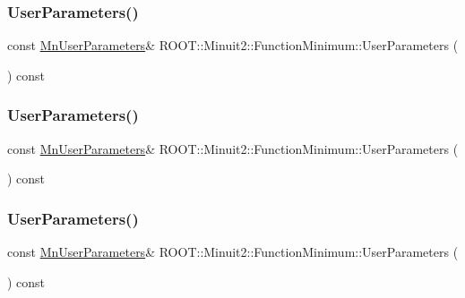 \subsubsection{\texorpdfstring{UserParameters()}{UserParameters()}\hspace{0.1cm}{\footnotesize\ttfamily [1/3]}}
{\footnotesize\ttfamily const \mbox{\hyperlink{classROOT_1_1Minuit2_1_1MnUserParameters}{Mn\+User\+Parameters}}\& R\+O\+O\+T\+::\+Minuit2\+::\+Function\+Minimum\+::\+User\+Parameters (\begin{DoxyParamCaption}{ }\end{DoxyParamCaption}) const\hspace{0.3cm}{\ttfamily [inline]}}

\mbox{\label{classROOT_1_1Minuit2_1_1FunctionMinimum_ac916253d7e29de7da4da5bf4b84a2ad5}} 
\subsubsection{\texorpdfstring{UserParameters()}{UserParameters()}\hspace{0.1cm}{\footnotesize\ttfamily [2/3]}}
{\footnotesize\ttfamily const \mbox{\hyperlink{classROOT_1_1Minuit2_1_1MnUserParameters}{Mn\+User\+Parameters}}\& R\+O\+O\+T\+::\+Minuit2\+::\+Function\+Minimum\+::\+User\+Parameters (\begin{DoxyParamCaption}{ }\end{DoxyParamCaption}) const\hspace{0.3cm}{\ttfamily [inline]}}

\mbox{\label{classROOT_1_1Minuit2_1_1FunctionMinimum_ac916253d7e29de7da4da5bf4b84a2ad5}} 
\subsubsection{\texorpdfstring{UserParameters()}{UserParameters()}\hspace{0.1cm}{\footnotesize\ttfamily [3/3]}}
{\footnotesize\ttfamily const \mbox{\hyperlink{classROOT_1_1Minuit2_1_1MnUserParameters}{Mn\+User\+Parameters}}\& R\+O\+O\+T\+::\+Minuit2\+::\+Function\+Minimum\+::\+User\+Parameters (\begin{DoxyParamCaption}{ }\end{DoxyParamCaption}) const\hspace{0.3cm}{\ttfamily [inline]}}

